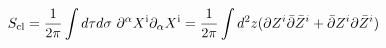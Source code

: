 \begin{equation}
S_{\rm cl}=
{1\over 2\pi} \int d\tau d\sigma ~\partial^\alpha X^{\rm i} 
 \partial_\alpha  X^{\rm i}
={1\over 2\pi} \int d^2 z (\partial Z^i \bar \partial \bar Z^i+
\bar\partial Z^i \partial \bar Z^i ) 
\end{equation}

